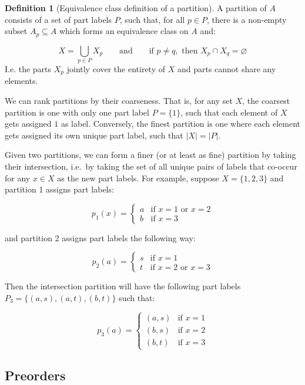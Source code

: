 \documentclass[
]{book}
\theoremstyle{definition}
\newtheorem{definition}{Definition}[chapter]
\theoremstyle{definition}
\theoremstyle{definition}
\theoremstyle{definition}
\theoremstyle{remark}
\begin{document}
\begin{definition}[Equivalence class definition of a partition]
A partition of \(A\) consists of a set of part labels \(P\), such that, for all \(p \in P\), there is a non-empty subset \(A_p \subseteq A\) which forms an equivalence class on \(A\) and:

\[X = \bigcup_{p \in P} X_p \qquad \text{and} \qquad \text{if } p \neq q, \text{ then } X_p \cap X_q = \varnothing\]
I.e. the parts \(X_p\) jointly cover the entirety of \(X\) and parts cannot share any elements.
\end{definition}

We can rank partitions by their coarseness. That is, for any set \(X\), the coarsest partition is one with only one part label \(P = \{ 1 \}\), such that each element of \(X\) gets assigned \(1\) as label. Conversely, the finest partition is one where each element gets assigned its own unique part label, such that \(\lvert X \lvert = \lvert P \lvert\).

Given two partitions, we can form a finer (or at least as fine) partition by taking their intersection, i.e.~by taking the set of all unique pairs of labels that co-occur for any \(x \in X\) as the new part labels. For example, suppose \(X = \{ 1, 2, 3 \}\) and partition 1 assigns part labels:

\[p_1(x) = \begin{cases} 
a & \text{if } x = 1 \text{ or } x = 2 \\
b & \text{if } x = 3
\end{cases}\]

and partition 2 assigns part labels the following way:

\[
p_2(a) = \begin{cases}
s & \text{if } x = 1 \\
t & \text{if } x = 2 \text{ or } x = 3
\end{cases}
\]

Then the intersection partition will have the following part labels \(P_3 = \{ (a, s), (a, t), (b, t) \}\) such that:

\[
p_3(a) = \begin{cases}
(a, s) & \text{if } x = 1 \\
(b, s) & \text{if } x = 2 \\ 
(b, t) & \text{if } x = 3
\end{cases}
\]

\hypertarget{preorders}{%
\subsection{Preorders}\label{preorders}}
\end{document}
